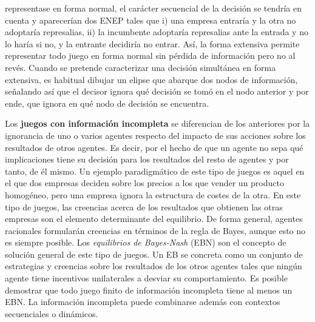 \documentclass{nuevotema}
\begin{document}
representase en forma normal, el carácter secuencial de la decisión se tendría en cuenta y aparecerían dos ENEP tales que i) una empresa entraría y la otra no adoptaría represalias, ii) la incumbente adoptaría represalias ante la entrada y no lo haría si no, y la entrante decidiría no entrar. Así, la forma extensiva permite representar todo juego en forma normal sin pérdida de información pero no al revés. Cuando se pretende caracterizar una decisión simultánea en forma extensiva, es habitual dibujar un elipse que abarque dos nodos de información, señalando así que el decisor ignora qué decisión se tomó en el nodo anterior y por ende, que ignora en qué nodo de decisión se encuentra. 

Los \textbf{juegos con información incompleta} se diferencian de los anteriores por la ignorancia de uno o varios agentes respecto del impacto de sus acciones sobre los resultados de otros agentes. Es decir, por el hecho de que un agente no sepa qué implicaciones tiene su decisión para los resultados del resto de agentes y por tanto, de él mismo. Un ejemplo paradigmático de este tipo de juegos es aquel en el que dos empresas deciden sobre los precios a los que vender un producto homogéneo, pero una empresa ignora la estructura de costes de la otra. En este tipo de juegos, las creencias acerca de los resultados que obtienen las otras empresas son el elemento determinante del equilibrio. De forma general, agentes racionales formularán creencias en términos de la regla de Bayes, aunque esto no es siempre posible. Los \textit{equilibrios de Bayes-Nash} (EBN) son el concepto de solución general de este tipo de juegos. Un EB se concreta como un conjunto de estrategias y creencias sobre los resultados de los otros agentes tales que ningún agente tiene incentivos unilaterales a desviar su comportamiento. Es posible demostrar que todo juego finito de información incompleta tiene al menos un EBN. La información incompleta puede combinarse además con contextos secuenciales o dinámicos. 
\end{document}
